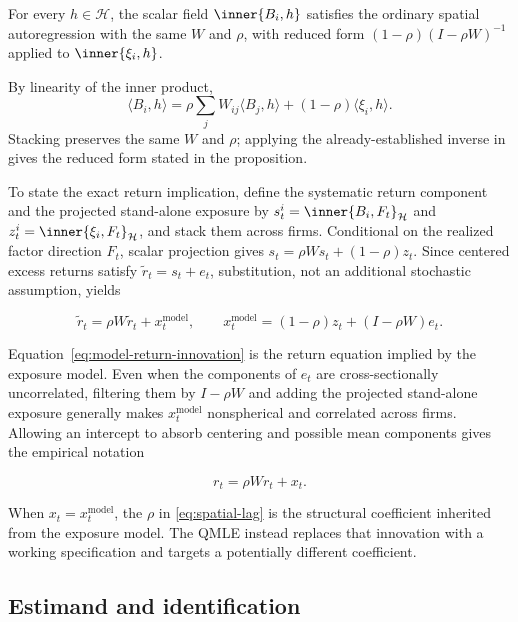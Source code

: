 \begin{proposition}\label{prop:scalar-projection}
  For every $h\in\mathcal H$, the scalar field $\inner{B_i,h}$ satisfies the
  ordinary spatial autoregression with the same $W$ and $\rho$, with reduced
  form $(1-\rho)(I-\rho W)^{-1}$ applied to $\inner{\xi_i,h}$.
\end{proposition}
By linearity of the inner product,
\[
  \langle B_i,h\rangle
  =\rho\sum_j W_{ij}\langle B_j,h\rangle
  +(1-\rho)\langle\xi_i,h\rangle.
\]
Stacking preserves the same $W$ and $\rho$; applying the already-established
inverse in  gives the reduced form stated in the
proposition.

To state the exact return implication, define the systematic return component
and the projected stand-alone exposure by
$s_t^i=\inner{B_i,F_t}_{\mathcal H}$ and
$z_t^i=\inner{\xi_i,F_t}_{\mathcal H}$, and stack them across firms.
Conditional on the realized factor direction $F_t$, scalar projection gives
$s_t=\rho Ws_t+(1-\rho)z_t$.
Since centered excess returns satisfy $\widetilde r_t=s_t+e_t$, substitution,
not an additional stochastic assumption, yields

\begin{equation}\label{eq:model-return-innovation}
  \widetilde r_t
  =\rho W\widetilde r_t+x_t^{\mathrm{model}},
  \qquad
  x_t^{\mathrm{model}}
  =(1-\rho)z_t+(I-\rho W)e_t.
\end{equation}

Equation~\eqref{eq:model-return-innovation} is the return equation implied by
the exposure model.
Even when the components of $e_t$ are cross-sectionally uncorrelated, filtering
them by $I-\rho W$ and adding the projected stand-alone exposure generally makes
$x_t^{\mathrm{model}}$ nonspherical and correlated across firms.
Allowing an intercept to absorb centering and possible mean components gives
the empirical notation

\begin{equation}\label{eq:spatial-lag}
  r_t = \rho W r_t + x_t .
\end{equation}

When $x_t=x_t^{\mathrm{model}}$, the $\rho$ in
\eqref{eq:spatial-lag} is the structural coefficient inherited from the
exposure model.
The QMLE instead replaces that innovation with a working specification and
targets a potentially different coefficient.

\subsection{Estimand and identification}


